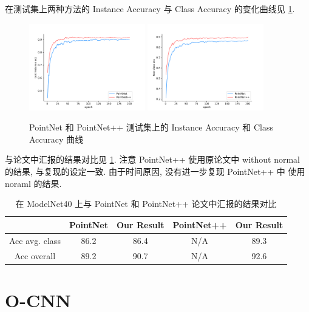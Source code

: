 \documentclass[11pt]{article}
\newcommand\1{\mathds{1}}
\begin{document}
在测试集上两种方法的 Instance Accuracy 与 Class Accuracy 的变化曲线见 \cref{fig:pointnet_test_acc}.
\begin{figure}[htbp]
    \centering
    \includegraphics[width = 0.45\textwidth]{./logs/figures/pointnet_test_ins_acc.pdf}
    \includegraphics[width = 0.45\textwidth]{./logs/figures/pointnet_test_class_acc.pdf}
    \caption{PointNet 和 PointNet++ 测试集上的 Instance Accuracy 和 Class Accuracy 曲线}
    \label{fig:pointnet_test_acc}
\end{figure}   
与论文中汇报的结果对比见 \cref{tab:pointnet_result}. 注意 PointNet++ 使用原论文中 without normal 的结果, 
与复现的设定一致. 由于时间原因, 没有进一步复现 PointNet++ 中 使用 noraml 的结果.

\begin{table}[htbp]
    \centering
    \begin{tabular}{ccccc}
    \toprule
    & \textbf{PointNet} & \textbf{Our Result} & \textbf{PointNet++}  & \textbf{Our Result} \\
    \midrule
    Acc avg. class & 86.2 & 86.4 & N/A &  89.3\\
    Acc overall & 89.2 & 90.7 & N/A & 92.6\\
    \bottomrule
\end{tabular}
    \caption{在 ModelNet40 上与 PointNet 和 PointNet++ 论文中汇报的结果对比}
    \label{tab:pointnet_result}
\end{table}


\section{O-CNN}
\end{document}
